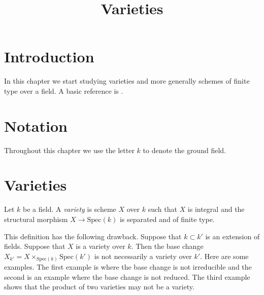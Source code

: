 

%


\title{Varieties}


\maketitle

\tableofcontents

\section{Introduction}
\label{section-introduction}

\noindent
In this chapter we start studying varieties and more generally
schemes of finite type over a field. A basic reference is \cite{EGA}.








\section{Notation}
\label{section-notation}

\noindent
Throughout this chapter we use the letter $k$ to denote the ground field.









\section{Varieties}
\label{section-varieties}

\begin{definition}
\label{definition-variety}
Let $k$ be a field. A {\it variety} is scheme $X$ over $k$
such that $X$ is integral and the structural morphism
$X \to \text{Spec}(k)$ is separated and of finite type.
\end{definition}

\noindent
This definition has the following drawback. Suppose that
$k \subset k'$ is an extension of fields. Suppose that $X$
is a variety over $k$. Then the base change
$X_{k'} = X \times_{\text{Spec}(k)} \text{Spec}(k')$ is
not necessarily a variety over $k'$. Here are some examples.
The first example is where the base change is not irreducible
and the second is an example where the base change is not
reduced. The third example shows that the product of two varieties
may not be a variety.

